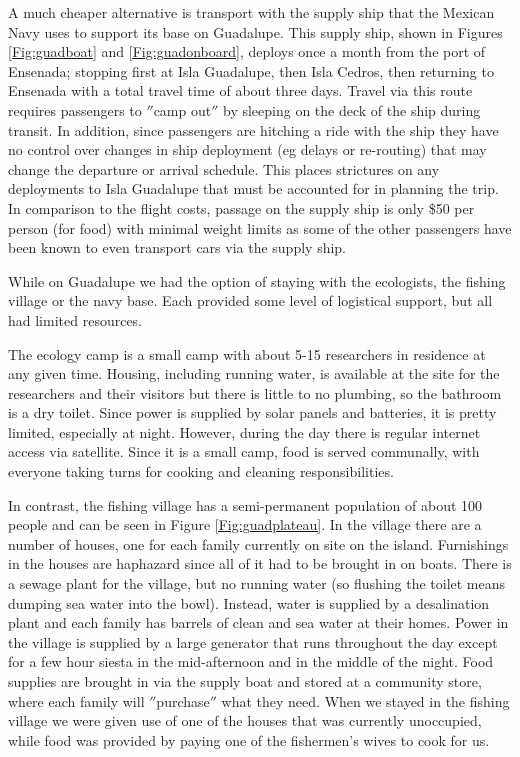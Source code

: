 A much cheaper alternative is transport with the supply ship that the Mexican Navy uses to support its base on Guadalupe. This supply ship, shown in Figures \ref{Fig:guadboat} and \ref{Fig:guadonboard}, deploys once a month from the port of Ensenada; stopping first at Isla Guadalupe, then Isla Cedros, then returning to Ensenada with a total travel time of about three days. Travel via this route requires passengers to $''$camp out$''$ by sleeping on the deck of the ship during transit. In addition, since passengers are hitching a ride with the ship they have no control over changes in ship deployment (eg delays or re-routing) that may change the departure or arrival schedule. This places strictures on any deployments to Isla Guadalupe that must be accounted for in planning the trip. In comparison to the flight costs, passage on the supply ship is only \$50 per person (for food) with minimal weight limits as some of the other passengers have been known to even transport cars via the supply ship. 

While on Guadalupe we had the option of staying with the ecologists, the fishing village or the navy base. Each provided some level of logistical support, but all had limited resources. 

The ecology camp is a small camp with about 5-15 researchers in residence at any given time. Housing, including running water, is available at the site for the researchers and their visitors but there is little to no plumbing, so the bathroom is a dry toilet.  Since power is supplied by solar panels and batteries, it is pretty limited, especially at night. However, during the day there is regular internet access via satellite. Since it is a small camp, food is served communally, with everyone taking turns for cooking and cleaning responsibilities. 

In contrast, the fishing village has a semi-permanent population of about 100 people and can be seen in Figure \ref{Fig:guadplateau}. In the village there are a number of houses, one for each family currently on site on the island. Furnishings in the houses are haphazard since all of it had to be brought in on boats. There is a sewage plant for the village, but no running water (so flushing the toilet means dumping sea water into the bowl). Instead, water is supplied by a desalination plant and each family has barrels of clean and sea water at their homes. Power in the village is supplied by a large generator that runs throughout the day except for a few hour siesta in the mid-afternoon and in the middle of the night. Food supplies are brought in via the supply boat and stored at a community store, where each family will $''$purchase$''$ what they need. When we stayed in the fishing village we were given use of one of the houses that was currently unoccupied, while food was provided by paying one of the fishermen's wives to cook for us. 

